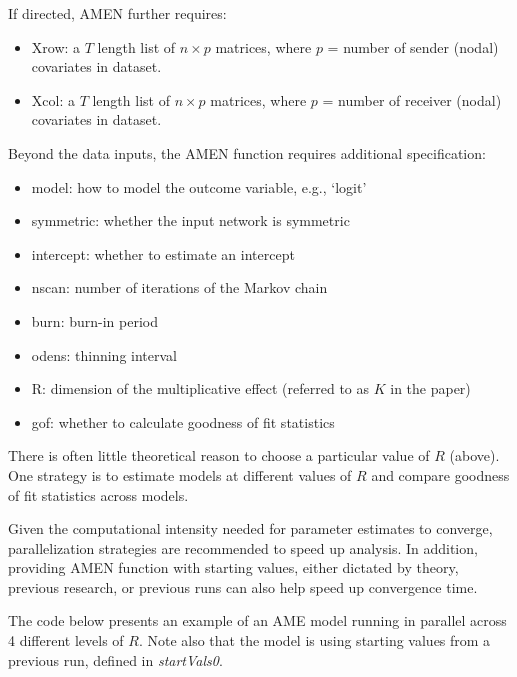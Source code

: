 If directed, AMEN further requires: 

\begin{itemize}[noitemsep,nolistsep]
    \item Xrow: a $T$ length list of $n\times p$ matrices, where $p$ = number of sender (nodal) covariates in dataset. 
    \item Xcol: a $T$ length list of $n\times p$ matrices, where $p$ = number of receiver (nodal) covariates in dataset. 
\end{itemize}

Beyond the data inputs, the AMEN function requires additional specification: 

\begin{itemize}
    \item model: how to model the outcome variable, e.g., `logit'
    \item symmetric: whether the input network is symmetric
    \item intercept: whether to estimate an intercept
    \item nscan: number of iterations of the Markov chain
    \item burn: burn-in period
    \item odens: thinning interval
    \item R: dimension of the multiplicative effect (referred to as $K$ in the paper)
    \item gof: whether to calculate goodness of fit statistics
\end{itemize}

There is often little theoretical reason to choose a particular value of $R$ (above). One strategy is to estimate models at different values of $R$ and compare goodness of fit statistics across models. 

Given the computational intensity needed for parameter estimates to converge, parallelization strategies are recommended to speed up analysis. In addition, providing AMEN function with starting values, either dictated by theory, previous research, or previous runs can also help speed up convergence time. 

The code below presents an example of an AME model running in parallel across 4 different levels of $R$. Note also that the model is using starting values from a previous run, defined in \textit{startVals0}. 


